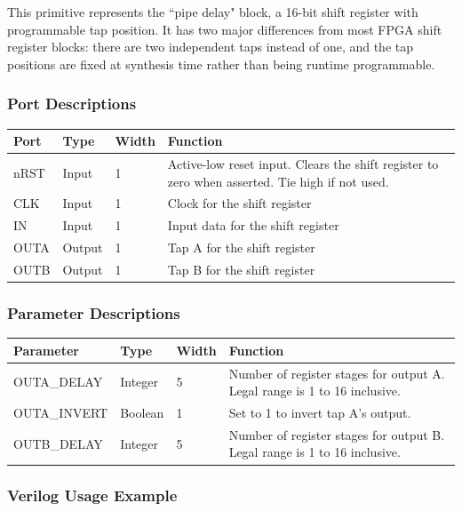 \documentclass{article}
\begin{document}
This primitive represents the ``pipe delay" block, a 16-bit shift register with programmable tap position. It has two 
major differences from most FPGA shift register blocks: there are two independent taps instead of one, and the tap 
positions are fixed at synthesis time rather than being runtime programmable.

\subsubsection{Port Descriptions}

\begin{tabularx}{5in}{|l|l|l|X|}
\hline
{\bfseries Port} & {\bfseries Type} & {\bfseries Width} & {\bfseries Function} \\
\hline
nRST & Input & 1 & Active-low reset input. Clears the shift register to zero when asserted. Tie high if not used.\\
\hline
CLK & Input & 1 & Clock for the shift register\\
\hline
IN & Input & 1 & Input data for the shift register\\
\hline
OUTA & Output & 1 & Tap A for the shift register\\
\hline
OUTB & Output & 1 & Tap B for the shift register\\
\hline
\end{tabularx}

\subsubsection{Parameter Descriptions}

\begin{tabularx}{5in}{|l|l|l|X|}
\hline
{\bfseries Parameter} & {\bfseries Type} & {\bfseries Width} & {\bfseries Function} \\
\hline
OUTA\_DELAY & Integer & 5 & Number of register stages for output A. Legal range is 1 to 16 inclusive.\\
\hline
OUTA\_INVERT & Boolean & 1 & Set to 1 to invert tap A's output.\\
\hline
OUTB\_DELAY & Integer & 5 & Number of register stages for output B. Legal range is 1 to 16 inclusive.\\
\hline
\end{tabularx}

\clearpage
\subsubsection{Verilog Usage Example}
\end{document}
